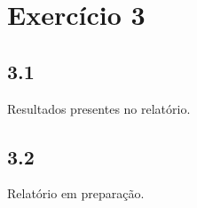 
\section*{\large Exercício 3}
%




\subsection*{3.1} 
%

Resultados presentes no relatório.

\subsection*{3.2} 
%

Relatório em preparação.





